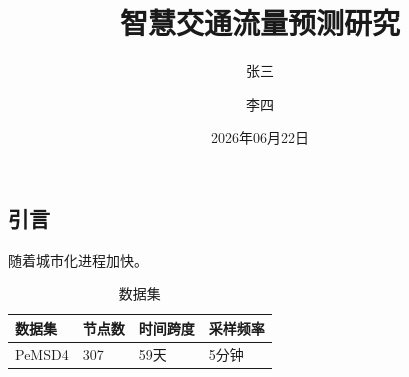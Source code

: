 \documentclass[twocolumn,dark,nomath]{harryopo-paper}
\title{智慧交通流量预测研究}
\author{张三 \and 李四}
\date{2026年06月22日}
\begin{document}
\maketitlewithabstract
\subsection{引言}
随着城市化进程加快。
\begin{table}[htbp]
  \centering
  \caption{数据集}
  \begin{tabular}{llll}
    \toprule
    数据集 & 节点数 & 时间跨度 & 采样频率 \\
    \midrule
    PeMSD4 & 307 & 59天 & 5分钟 \\
    \bottomrule
  \end{tabular}
\end{table}
\end{document}
